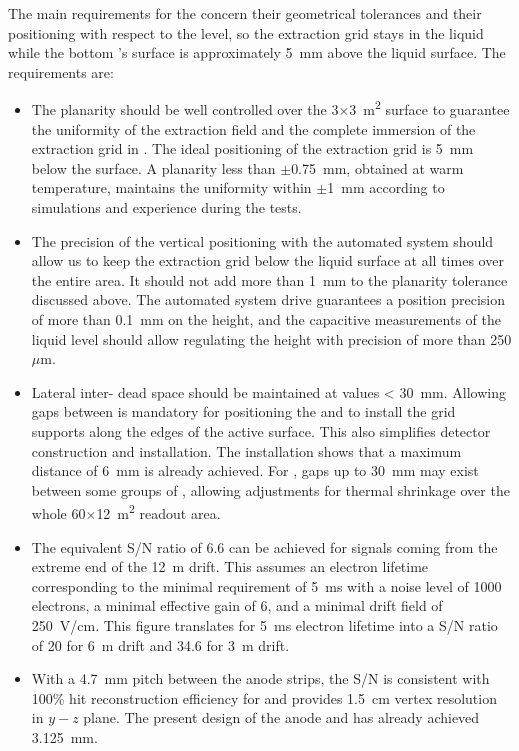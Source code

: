 The main requirements for the  concern their geometrical tolerances and their positioning with respect to the  level, so the extraction grid stays in the liquid while the bottom 's surface is approximately \SI{5}{\mm} above the liquid surface. The requirements are:
\begin{itemize}
\item{ The  planarity should be well controlled over the \num{3}$\times$\SI{3}{\m^{2}} surface to guarantee the uniformity  of  the extraction field and the complete immersion of the extraction grid in .  The ideal positioning of the 
extraction grid is \SI{5}{\mm} below the  surface. A planarity less than $\pm$\SI{0.75}{\mm}, obtained at  warm temperature, maintains the uniformity within $\pm$\SI{1}{\mm} according to simulations and  experience during the  \coldbox tests. } 

\item{The precision of the  vertical positioning with the automated system should allow us to keep the extraction grid below the liquid surface at all times over the entire  area. It should not add more  than  \SI{1}{\mm} to the planarity tolerance discussed above. The automated system drive guarantees a position precision of more than \SI{0.1}{\mm} on the  height, and the capacitive measurements of the liquid level should allow regulating the height with precision of more than  \num{250}$\mu$m}.

\item{Lateral inter- dead space should be maintained at values  
< \SI{30}{mm}.
Allowing gaps between  is mandatory for positioning the  and to install the grid supports along the edges of the active  surface. This also simplifies detector construction and installation. The  installation shows that a maximum distance of  \SI{6}{\mm}  is already achieved. 
For  , gaps up to \SI{30}{\mm} may  exist between some groups of , allowing adjustments for thermal shrinkage over the whole  \num{60}$\times$\SI{12}{\m^{2}} readout area.}

\item{The equivalent S/N ratio of \num{6.6} can be achieved for signals coming from the extreme end of the \SI{12}{\m} drift. This assumes an electron lifetime corresponding to  the minimal requirement of \SI{5}{\ms} with a noise level of \num{1000} electrons, a minimal  effective  gain of \num{6}, and a minimal drift field of \SI{250}{V/cm}. This figure translates for \SI{5}{\ms} electron lifetime into a S/N ratio of  \num{20} for \SI{6}{\m} drift and \num{34.6} for \SI{3}{\m} drift. }

\item{With a \SI{4.7}{\mm} pitch between the anode strips, the S/N is consistent with 100\% hit reconstruction efficiency for   and provides \SI{1.5}{cm} vertex resolution in $y-z$ plane.
The present  design of the anode and  has already achieved \SI{3.125}{\mm}}.
\end{itemize}
